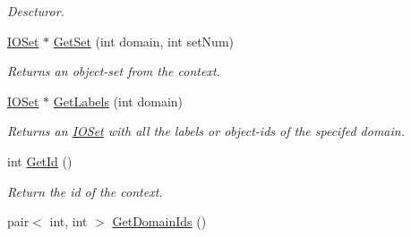 \begin{DoxyCompactItemize}
\begin{DoxyCompactList}\small\item\em Descturor. \item\end{DoxyCompactList}\item 
\hyperlink{class_i_o_set}{IOSet} $\ast$ \hyperlink{class_context_adeeca59fd329ad829de527c37489e7b8}{GetSet} (int domain, int setNum)
\begin{DoxyCompactList}\small\item\em Returns an object-\/set from the context. \item\end{DoxyCompactList}\item 
\hyperlink{class_i_o_set}{IOSet} $\ast$ \hyperlink{class_context_a980ed3eb69cc388465263025203cf1c8}{GetLabels} (int domain)
\begin{DoxyCompactList}\small\item\em Returns an \hyperlink{class_i_o_set}{IOSet} with all the labels or object-\/ids of the specifed domain. \item\end{DoxyCompactList}\item 
\hypertarget{class_context_a25534dd063517e00875840cd53c2bacd}{
int \hyperlink{class_context_a25534dd063517e00875840cd53c2bacd}{GetId} ()}
\label{class_context_a25534dd063517e00875840cd53c2bacd}

\begin{DoxyCompactList}\small\item\em Return the id of the context. \item\end{DoxyCompactList}\item 
\hypertarget{class_context_abf904165924eb0b4b0e3bf580859903a}{
pair$<$ int, int $>$ \hyperlink{class_context_abf904165924eb0b4b0e3bf580859903a}{GetDomainIds} ()}
\label{class_context_abf904165924eb0b4b0e3bf580859903a}


\end{DoxyCompactItemize}
